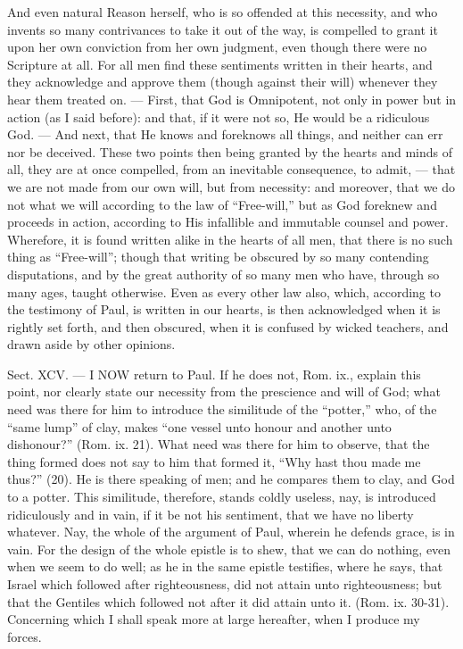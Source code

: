 And even natural Reason herself, who is so offended at this necessity, and who invents so many contrivances to take it out of the way, is compelled to grant it upon her own conviction from her own judgment, even though there were no Scripture at all. For all men find these sentiments written in their hearts, and they acknowledge and approve them (though against their will) whenever they hear them treated on. — First, that God is Omnipotent, not only in power but in action (as I said before): and that, if it were not so, He would be a ridiculous God. — And next, that He knows and foreknows all things, and neither can err nor be deceived. These two points then being granted by the hearts and minds of all, they are at once compelled, from an inevitable consequence, to admit, — that we are not made from our own will, but from necessity: and moreover, that we do not what we will according to the law of “Free-will,” but as God foreknew and proceeds in action, according to His infallible and immutable counsel and power. Wherefore, it is found written alike in the hearts of all men, that there is no such thing as “Free-will”; though that writing be obscured by so many contending disputations, and by the great authority of so many men who have, through so many ages, taught otherwise. Even as every other law also, which, according to the testimony of Paul, is written in our hearts, is then acknowledged when it is rightly set forth, and then obscured, when it is confused by wicked teachers, and drawn aside by other opinions.


Sect. XCV. — I NOW return to Paul. If he does not, Rom. ix., explain this point, nor clearly state our necessity from the prescience and will of God; what need was there for him to introduce the similitude of the “potter,” who, of the “same lump” of clay, makes “one vessel unto honour and another unto dishonour?” (Rom. ix. 21). What need was there for him to observe, that the thing formed does not say to him that formed it, “Why hast thou made me thus?” (20). He is there speaking of men; and he compares them to clay, and God to a potter. This similitude, therefore, stands coldly useless, nay, is introduced ridiculously and in vain, if it be not his sentiment, that we have no liberty whatever. Nay, the whole of the argument of Paul, wherein he defends grace, is in vain. For the design of the whole epistle is to shew, that we can do nothing, even when we seem to do well; as he in the same epistle testifies, where he says, that Israel which followed after righteousness, did not attain unto righteousness; but that the Gentiles which followed not after it did attain unto it. (Rom. ix. 30-31). Concerning which I shall speak more at large hereafter, when I produce my forces.

